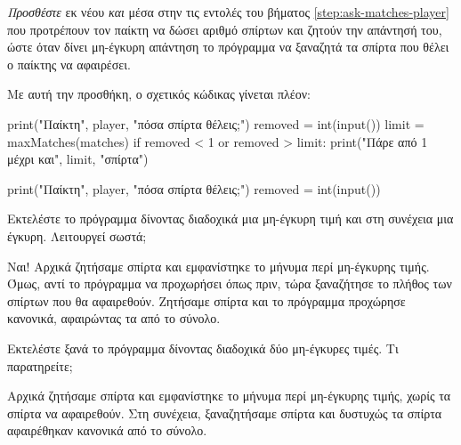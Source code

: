 \documentclass[a4paper,11pt,oneside]{book}
\begin{document}
\begin{step}
\label{step:check-matches-2}
\emph{Προσθέστε} εκ νέου \emph{και} μέσα στην  τις εντολές του βήματος \ref{step:ask-matches-player} που προτρέπουν τον παίκτη να δώσει αριθμό σπίρτων και ζητούν την απάντησή του, ώστε όταν δίνει μη-έγκυρη απάντηση το πρόγραμμα να ξαναζητά τα σπίρτα που θέλει ο παίκτης να αφαιρέσει.

\begin{answer}
Με αυτή την προσθήκη, ο σχετικός κώδικας γίνεται πλέον:

\begin{pyplain}
    print("Παίκτη", player, "πόσα σπίρτα θέλεις;")
    removed = int(input())
    limit = maxMatches(matches)
    if removed < 1 or removed > limit:
        print("Πάρε από 1 μέχρι και", limit, "σπίρτα") 
\end{pyplain}
\begin{pynew}
        print("Παίκτη", player, "πόσα σπίρτα θέλεις;")
        removed = int(input())
\end{pynew}
\end{answer}

Εκτελέστε το πρόγραμμα δίνοντας διαδοχικά μια μη-έγκυρη τιμή και στη συνέχεια μια έγκυρη. Λειτουργεί σωστά;

\begin{answer}
Ναι! Αρχικά ζητήσαμε  σπίρτα και εμφανίστηκε το μήνυμα περί μη-έγκυρης τιμής. Όμως, αντί το πρόγραμμα να προχωρήσει όπως πριν, τώρα ξαναζήτησε το πλήθος των σπίρτων που θα αφαιρεθούν. Ζητήσαμε  σπίρτα και το πρόγραμμα προχώρησε κανονικά, αφαιρώντας τα από το σύνολο.
\end{answer}

Εκτελέστε ξανά το πρόγραμμα δίνοντας διαδοχικά δύο μη-έγκυρες τιμές. Τι παρατηρείτε; 

\begin{answer}
Αρχικά ζητήσαμε  σπίρτα και εμφανίστηκε το μήνυμα περί μη-έγκυρης τιμής, χωρίς τα σπίρτα να αφαιρεθούν. Στη συνέχεια, ξαναζητήσαμε  σπίρτα και δυστυχώς τα σπίρτα αφαιρέθηκαν κανονικά από το σύνολο.
\end{answer}
\end{step}
\end{document}
